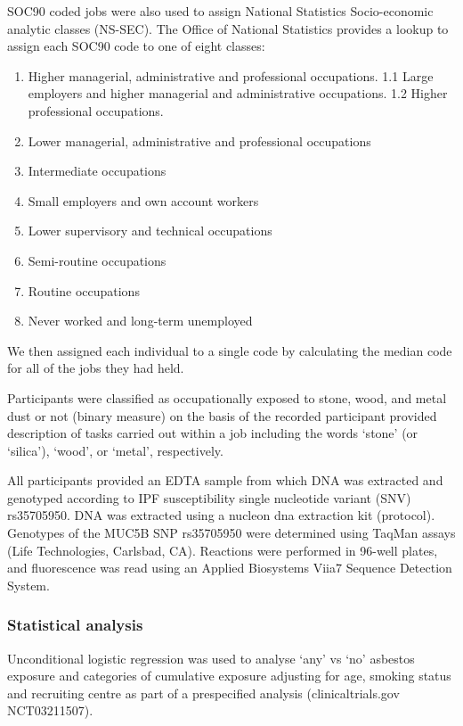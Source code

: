 \documentclass[
]{article}
\providecommand{\tightlist}{%
  \setlength{\itemsep}{0pt}\setlength{\parskip}{0pt}}
\begin{document}
SOC90 coded jobs were also used to assign National Statistics
Socio-economic analytic classes (NS-SEC). The Office of National
Statistics provides a lookup to assign each SOC90 code to one of eight
classes:

\begin{enumerate}
\def\labelenumi{\arabic{enumi}.}
\tightlist
\item
  Higher managerial, administrative and professional occupations. 1.1
  Large employers and higher managerial and administrative occupations.
  1.2 Higher professional occupations.
\item
  Lower managerial, administrative and professional occupations
\item
  Intermediate occupations
\item
  Small employers and own account workers
\item
  Lower supervisory and technical occupations
\item
  Semi-routine occupations
\item
  Routine occupations
\item
  Never worked and long-term unemployed
\end{enumerate}

We then assigned each individual to a single code by calculating the
median code for all of the jobs they had held.

Participants were classified as occupationally exposed to stone, wood,
and metal dust or not (binary measure) on the basis of the recorded
participant provided description of tasks carried out within a job
including the words `stone' (or `silica'), `wood', or `metal',
respectively.

All participants provided an EDTA sample from which DNA was extracted
and genotyped according to IPF susceptibility single nucleotide variant
(SNV) rs35705950. DNA was extracted using a nucleon dna extraction kit
(protocol). Genotypes of the MUC5B SNP rs35705950 were determined using
TaqMan assays (Life Technologies, Carlsbad, CA). Reactions were
performed in 96-well plates, and fluorescence was read using an Applied
Biosystems Viia7 Sequence Detection System.

\hypertarget{statistical-analysis}{%
\subsubsection{Statistical analysis}\label{statistical-analysis}}

Unconditional logistic regression was used to analyse `any' vs `no'
asbestos exposure and categories of cumulative exposure adjusting for
age, smoking status and recruiting centre as part of a prespecified
analysis (clinicaltrials.gov NCT03211507).
\end{document}
